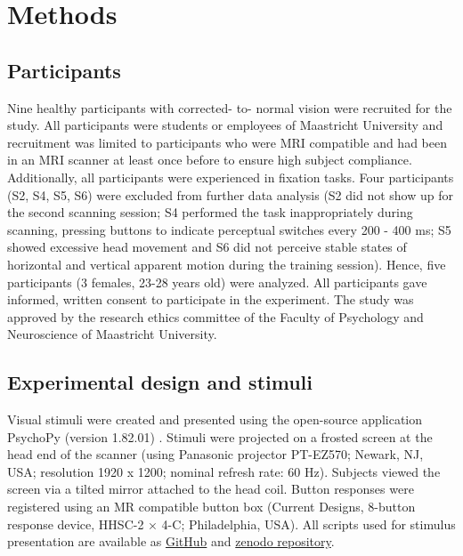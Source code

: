 \section{Methods}
\subsection{Participants}
Nine healthy participants with corrected- to- normal vision were recruited for the study. All participants were students or employees of Maastricht University and recruitment was limited to participants who were MRI compatible and had been in an MRI scanner at least once before to ensure high subject compliance. Additionally, all participants were experienced in fixation tasks. Four participants (S2, S4, S5, S6) were excluded from further data analysis (S2 did not show up for the second scanning session; S4 performed the task inappropriately during scanning, pressing buttons to indicate perceptual switches every 200 - 400 ms; S5 showed excessive head movement and S6 did not perceive stable states of horizontal and vertical apparent motion during the training session). Hence, five participants (3 females, 23-28 years old) were analyzed. All participants gave informed, written consent to participate in the experiment. The study was approved by the research ethics committee of the Faculty of Psychology and Neuroscience of Maastricht University.

\subsection{Experimental design and stimuli}
Visual stimuli were created and presented using the open-source application PsychoPy (version 1.82.01) \parencite{Peirce2007,Peirce2008}. Stimuli were projected on a frosted screen at the head end of the scanner (using Panasonic projector PT-EZ570; Newark, NJ, USA; resolution 1920 x 1200; nominal refresh rate: 60 Hz). Subjects viewed the screen via a tilted mirror attached to the head coil. Button responses were registered using an MR compatible button box (Current Designs, 8-button response device, HHSC-2 × 4-C; Philadelphia, USA). All scripts used for stimulus presentation are available as \href{https://github.com/MSchnei/motion_quartet_scripts}{GitHub} and \href{https://zenodo.org/record/1489246}{zenodo repository}.

